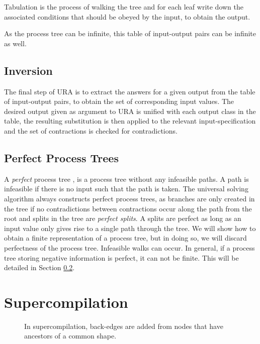 \documentclass[10pt]{../sigplanconf}
\begin{document}
Tabulation is the process of walking the tree and for each leaf write
down the associated conditions that should be obeyed by the input, to
obtain the output.

As the process tree can be infinite, this table of input-output pairs
can be infinite as well.

\subsection{Inversion}
The final step of URA is to extract the answers for a given output
from the table of input-output pairs, to obtain the set of
corresponding input values. The desired output given as argument to
URA is unified with each output class in the table, the resulting
substitution is then applied to the relevant input-specification and
the set of contractions is checked for contradictions.

\subsection{Perfect Process Trees}
A \textit{perfect} process tree \cite{gluck1993occam}, is a process
tree without any infeasible paths. A path is infeasible if there is no
input such that the path is taken. The universal solving algorithm
always constructs perfect process trees, as branches are only created
in the tree if no contradictions between contractions occur along the
path from the root and splits in the tree are \textit{perfect
  splits}. A splits are perfect as long as an input value only gives
rise to a single path through the tree. We will show how to obtain a
finite representation of a process tree, but in doing so, we will
discard perfectness of the process tree. Infeasible walks can
occur. In general, if a process tree storing negative information is
perfect, it can not be finite. This will be detailed in Section \ref{}.

\section{Supercompilation}
\label{sec:supercompilation}
\begin{figure}
  \centering
\caption{In supercompilation, back-edges are added from nodes that
  have ancestors of a common shape.}
  \label{fig:backedge}
\end{figure}
\end{document}
